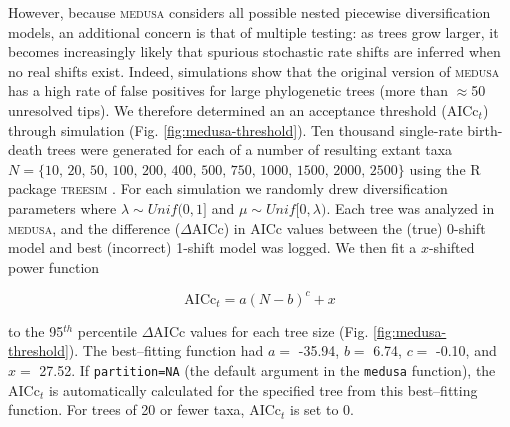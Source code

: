 However, because \textsc{medusa} considers all possible nested piecewise diversification models, an additional concern is that of multiple testing: as trees grow larger, it becomes increasingly likely that spurious stochastic rate shifts are inferred when no real shifts exist. Indeed, simulations show that the original version of \textsc{medusa} has a high rate of false positives for large phylogenetic trees (more than $\approx$50 unresolved tips). We therefore determined an an acceptance threshold (AICc$_t$) through simulation (Fig. \ref{fig:medusa-threshold}). Ten thousand single-rate birth-death trees were generated for each of a number of resulting extant taxa $N = \lbrace \text{10, 20, 50, 100, 200, 400, 500, 750, 1000, 1500, 2000, 2500} \rbrace$ using the R package \textsc{treesim} \citep{treesim}. For each simulation we randomly drew diversification parameters where $\lambda \sim Unif(0,1]$ and $\mu \sim Unif[0, \lambda)$. Each tree was analyzed in \textsc{medusa}, and the difference ($\Delta$AICc) in AICc values between the (true) 0-shift model and best (incorrect) 1-shift model was logged. We then fit a $x$-shifted power function

\begin{equation}
\mathrm{AICc}_{t} = a (N - b)^{c} + x 
\end{equation}

to the 95$^{th}$ percentile $\Delta$AICc values for each tree size (Fig. \ref{fig:medusa-threshold}). The best--fitting function had $a =$ -35.94, $b =$ 6.74, $c =$ -0.10, and $x =$ 27.52. If \texttt{partition=NA} (the default argument in the \texttt{medusa} function), the AICc$_{t}$ is automatically calculated for the specified tree from this best--fitting function. For trees of 20 or fewer taxa, AICc$_{t}$ is set to 0.

